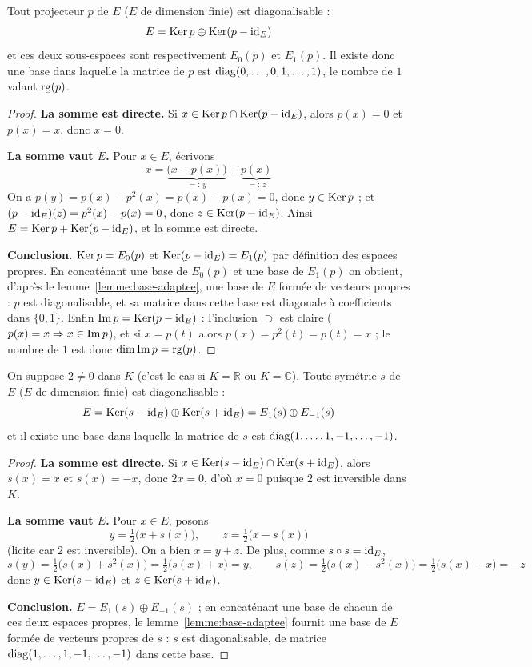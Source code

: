 \documentclass[11pt]{article}
\begin{document}
\begin{prop}
\label{prop:projecteur-diago}
Tout projecteur $p$ de $E$ ($E$ de dimension finie) est diagonalisable :
\[E = \operatorname{Ker} p \oplus \operatorname{Ker}(p-\operatorname{id}_E)\]
et ces deux sous-espaces sont respectivement $E_0(p)$ et $E_1(p)$. Il existe donc une base dans laquelle la matrice de $p$ est $\operatorname{diag}(0,\dots,0,1,\dots,1)$, le nombre de $1$ valant $\operatorname{rg}(p)$.
\end{prop}

\begin{proof}
\textbf{La somme est directe.} Si $x\in\operatorname{Ker} p\cap\operatorname{Ker}(p-\operatorname{id}_E)$, alors $p(x)=0$ et $p(x)=x$, donc $x=0$.

\textbf{La somme vaut $E$.} Pour $x\in E$, écrivons
\[x = \underbrace{\big(x-p(x)\big)}_{=:\,y} + \underbrace{p(x)}_{=:\,z}\]
On a $p(y)=p(x)-p^2(x)=p(x)-p(x)=0$, donc $y\in\operatorname{Ker} p$ ; et $(p-\operatorname{id}_E)(z)=p^2(x)-p(x)=0$, donc $z\in\operatorname{Ker}(p-\operatorname{id}_E)$. Ainsi $E=\operatorname{Ker} p+\operatorname{Ker}(p-\operatorname{id}_E)$, et la somme est directe.

\textbf{Conclusion.} $\operatorname{Ker} p=E_0(p)$ et $\operatorname{Ker}(p-\operatorname{id}_E)=E_1(p)$ par définition des espaces propres. En concaténant une base de $E_0(p)$ et une base de $E_1(p)$ on obtient, d'après le lemme~\ref{lemme:base-adaptee}, une base de $E$ formée de vecteurs propres : $p$ est diagonalisable, et sa matrice dans cette base est diagonale à coefficients dans $\{0,1\}$. Enfin $\operatorname{Im} p=\operatorname{Ker}(p-\operatorname{id}_E)$ : l'inclusion $\supset$ est claire ($p(x)=x\Rightarrow x\in\operatorname{Im} p$), et si $x=p(t)$ alors $p(x)=p^2(t)=p(t)=x$ ; le nombre de $1$ est donc $\dim\operatorname{Im} p=\operatorname{rg}(p)$.
\end{proof}

\begin{prop}
\label{prop:symetrie-diago}
On suppose $2\neq 0$ dans $K$ (c'est le cas si $K=\mathbb{R}$ ou $K=\mathbb{C}$). Toute symétrie $s$ de $E$ ($E$ de dimension finie) est diagonalisable :
\[E = \operatorname{Ker}(s-\operatorname{id}_E)\oplus\operatorname{Ker}(s+\operatorname{id}_E) = E_1(s)\oplus E_{-1}(s)\]
et il existe une base dans laquelle la matrice de $s$ est $\operatorname{diag}(1,\dots,1,-1,\dots,-1)$.
\end{prop}

\begin{proof}
\textbf{La somme est directe.} Si $x\in\operatorname{Ker}(s-\operatorname{id}_E)\cap\operatorname{Ker}(s+\operatorname{id}_E)$, alors $s(x)=x$ et $s(x)=-x$, donc $2x=0$, d'où $x=0$ puisque $2$ est inversible dans $K$.

\textbf{La somme vaut $E$.} Pour $x\in E$, posons
\[y = \tfrac{1}{2}\big(x+s(x)\big), \qquad z = \tfrac{1}{2}\big(x-s(x)\big)\]
(licite car $2$ est inversible). On a bien $x=y+z$. De plus, comme $s\circ s=\operatorname{id}_E$,
\[s(y) = \tfrac12\big(s(x)+s^2(x)\big) = \tfrac12\big(s(x)+x\big) = y, \qquad s(z) = \tfrac12\big(s(x)-s^2(x)\big) = \tfrac12\big(s(x)-x\big) = -z\]
donc $y\in\operatorname{Ker}(s-\operatorname{id}_E)$ et $z\in\operatorname{Ker}(s+\operatorname{id}_E)$.

\textbf{Conclusion.} $E=E_1(s)\oplus E_{-1}(s)$ ; en concaténant une base de chacun de ces deux espaces propres, le lemme~\ref{lemme:base-adaptee} fournit une base de $E$ formée de vecteurs propres de $s$ : $s$ est diagonalisable, de matrice $\operatorname{diag}(1,\dots,1,-1,\dots,-1)$ dans cette base.
\end{proof}
\end{document}

